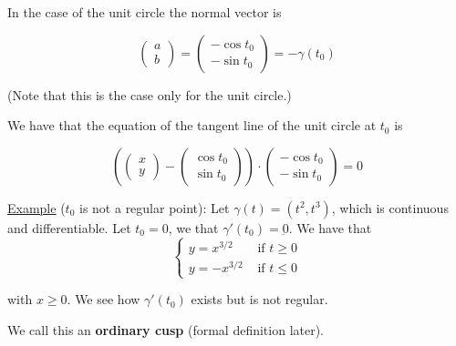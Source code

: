 \documentclass[10pt]{extarticle}
\renewcommand{\vec}[1]{\underbar{\ensuremath{#1}}}
\begin{document}
In the case of the unit circle the normal vector is

$$
    \begin{pmatrix}
        a \\ b
    \end{pmatrix}
    =
    \begin{pmatrix}
        -\cos t_0 \\ -\sin t_0
    \end{pmatrix}
    =
    - \gamma(t_0)
$$

(Note that this is the case only for the unit circle.)

We have that the equation of the tangent line of the unit circle at $t_0$ is

$$
    \left(
    \begin{pmatrix}
            x \\ y
        \end{pmatrix} - \begin{pmatrix}
            \cos t_0 \\ \sin t_0
        \end{pmatrix}
    \right)
    \cdot
    \begin{pmatrix}
        -\cos t_0 \\ -\sin t_0
    \end{pmatrix}
    = 0
$$

\underline{Example} ($t_0$ is not a regular point):
Let $\gamma(t) = (t^2, t^3)$, which is continuous and differentiable.
Let $t_0 = 0$, we that $\gamma'(t_0) = \vec{0}$.
We have that
$$
    \begin{cases}
        y = x^{3/2}  & \text{ if } t \geq 0 \\
        y = -x^{3/2} & \text{ if } t \leq 0
    \end{cases}
$$

with $x \geq 0$. We see how $\gamma'(t_0)$ exists but is not regular.

We call this an \textbf{ordinary cusp} (formal definition later).
\end{document}
